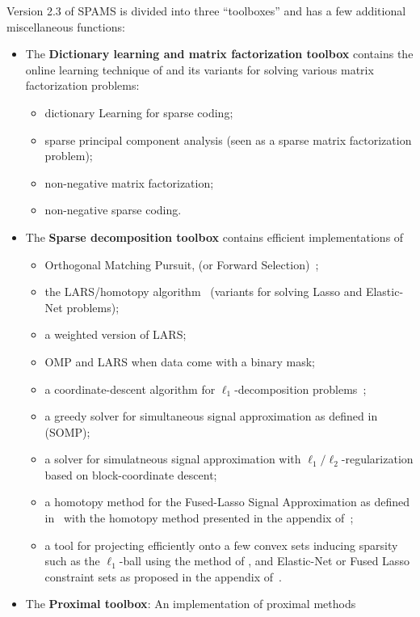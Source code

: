 \documentclass[a4paper, 11pt]{article}
\begin{document}
Version 2.3 of SPAMS is divided into three ``toolboxes'' and has a few
additional miscellaneous functions:
\begin{itemize}
\item The \textbf{Dictionary learning and matrix factorization toolbox}
contains the online learning technique of \cite{mairal7,mairal9} and its
variants for solving various matrix factorization problems:
\begin{itemize}
\item dictionary Learning for sparse coding;
\item sparse principal component analysis (seen as a sparse matrix factorization problem);
\item non-negative matrix factorization;
\item non-negative sparse coding.
\end{itemize}
\item The \textbf{Sparse decomposition toolbox} contains efficient implementations of
\begin{itemize}
\item Orthogonal Matching Pursuit, (or Forward Selection)~\cite{weisberg,mallat4};
\item the LARS/homotopy algorithm~\cite{osborne,efron} (variants for solving Lasso and Elastic-Net problems);
\item a weighted version of LARS; 
\item OMP and LARS when data come with a binary mask;
\item a coordinate-descent algorithm for $\ell_1$-decomposition problems~\cite{fu,friedman,wu}; 
\item a greedy solver for simultaneous signal approximation as defined in~\cite{tropp2,tropp3} (SOMP);
\item a solver for simulatneous signal approximation with $\ell_1/\ell_2$-regularization based on block-coordinate descent;
\item a homotopy method for the Fused-Lasso Signal Approximation as defined in~\cite{friedman} with the homotopy method presented in the appendix of~\cite{mairal9};
\item a tool for projecting efficiently onto a few convex sets
inducing sparsity such as the $\ell_1$-ball using the method of
\cite{brucker,maculan,duchi}, and Elastic-Net or Fused Lasso constraint sets as
proposed in the appendix of~\cite{mairal9}.
\end{itemize}
\item The \textbf{Proximal toolbox}: An implementation of proximal methods

\end{itemize}
\end{document}
